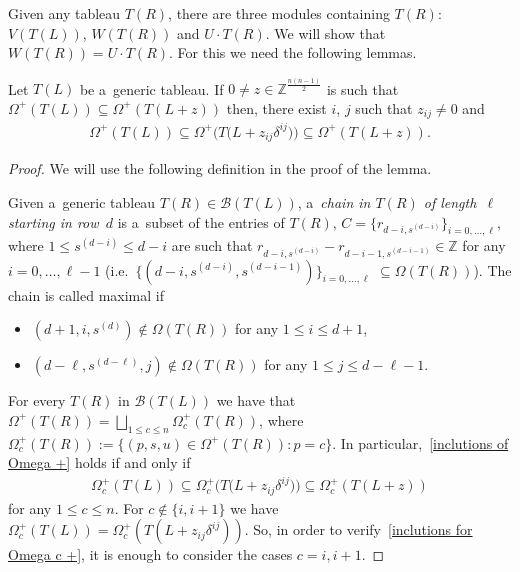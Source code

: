 Given any tableau $T(R)$, there are three modules containing $T(R)$: $V(T(L))$, $ W(T(R))$ and $U\cdot T(R)$.
We will show that $ W(T(R))=U\cdot T(R)$.
For this we need the following lemmas.

\begin{Lemma}
\label{paths for connected tableaux}
Let $T(L)$ be a~generic tableau.
If $0\neq z\in\mathbb{Z}^{\frac{n(n-1)}{2}}$ is such that $\Omega^{+}(T(L))\subseteq\Omega^{+}(T(L+z))$ then, there
exist $i$, $j$ such that $z_{ij}\neq 0$ and
\begin{gather}
\label{inclutions of Omega +}
\Omega^{+}(T(L))\subseteq\Omega^{+}\big(T\big(L+z_{ij}\delta^{ij}\big)\big)\subseteq\Omega^{+}(T(L+z)).
\end{gather}
\end{Lemma}
\begin{proof}
We will use the following def\/inition in the proof of the lemma.

\begin{Definition}
Given a~generic tableau $T(R)\in\mathcal{B}(T(L))$, a~\emph{chain in $T(R)$ of length~$\ell$ starting in row~$d$} is
a~subset of the entries of $T(R)$, $C=\{r_{d-i,s^{(d-i)}}\}_{i=0,\ldots, \ell}$, where $1\leq s^{(d-i)}\leq d-i$ are
such that $r_{d-i,s^{(d-i)}}-r_{d-i-1,s^{(d-i-1)}}\in\mathbb{Z}$ for any $i=0,\ldots,\ell-1$
(i.e.~$\{(d-i,s^{(d-i)},s^{(d-i-1)})\}_{i=0,\ldots,\ell}$ $\subseteq\Omega(T(R))$). The chain is called maximal if
\begin{itemize}\itemsep=0pt
\item[(i)] $(d+1,i,s^{(d)})\notin\Omega(T(R))$ for any $1\leq i\leq d+1$,
\item[(ii)] $(d-\ell,s^{(d-\ell)},j)\notin\Omega(T(R))$ for any $1\leq j\leq d-\ell-1$.
\end{itemize}
\end{Definition}

For every $T(R)$ in $\mathcal{B}(T(L))$ we have that $\Omega^{+}(T(R))= \bigsqcup_{1\leq c\leq n}\Omega^{+}_{c}(T(R))$,
where $\Omega^{+}_{c}(T(R)):=\{(p,s,u)\in\Omega^{+}(T(R)): p=c\}$.
In particular,~\eqref{inclutions of Omega +} holds if and only if
\begin{gather}
\label{inclutions for Omega c +}
\Omega^{+}_{c}(T(L))\subseteq\Omega^{+}_{c}\big(T\big(L+z_{ij}\delta^{ij}\big)\big)\subseteq\Omega^{+}_{c}(T(L+z))
\end{gather}
for any $1\leq c\leq n$.
For $c\notin\{i,i+1 \}$ we have $\Omega^{+}_{c}(T(L))=\Omega^{+}_{c}(T(L+z_{ij}\delta^{ij}))$.
So, in order to verify~\eqref{inclutions for Omega c +}, it is enough to consider the cases $c=i, i+1$.


\end{proof}
